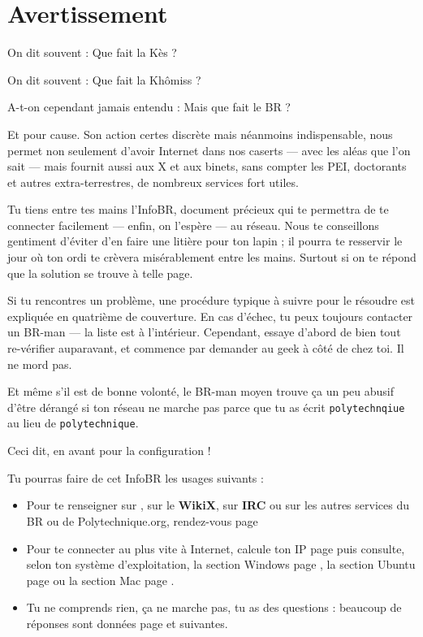 \thispagestyle{empty}

\section*{Avertissement}

On dit souvent : \og Que fait la Kès ? \fg

On dit souvent : \og Que fait la Khômiss ? \fg

A-t-on cependant jamais entendu : \og Mais que fait le BR ? \fg

Et pour cause. Son action certes discrète mais néanmoins indispensable, nous permet non seulement d'avoir Internet dans nos caserts --- avec les aléas que l'on sait --- mais fournit aussi aux X et aux binets,
sans compter les PEI, doctorants et autres extra-terrestres, de nombreux services fort utiles.

Tu tiens entre tes mains l'InfoBR, document pr\'ecieux qui te permettra de te connecter facilement
--- enfin, on l'esp\`ere --- au r\'eseau.
Nous te conseillons gentiment d'\'eviter d'en faire une liti\`ere pour ton lapin ; il pourra te resservir le jour o\`u ton ordi te cr\`evera mis\'erablement entre les
mains. Surtout si on te r\'epond que la solution se trouve \`a telle page.

Si tu rencontres un probl\`eme, une proc\'edure typique \`a suivre pour le r\'esoudre est expliqu\'ee en quatri\`eme de couverture.
En cas d'échec, tu peux toujours contacter un BR-man --- la liste est \`a l'int\'erieur.
Cependant, essaye d'abord de bien tout re-v\'erifier auparavant, et commence par demander au geek à côté de chez toi. Il ne mord pas.

Et m\^eme s'il est de bonne volont\'e, le BR-man moyen trouve ça un peu abusif d'\^etre d\'erang\'e si ton r\'eseau ne
marche pas parce que tu as \'ecrit \texttt{polytechnqiue} au lieu de \texttt{polytechnique}.

Ceci dit, en avant pour la configuration !

\vfill


Tu pourras faire de cet InfoBR les usages suivants :
\begin{itemize}
\item Pour te renseigner sur \fkz, sur le \textbf{WikiX}, sur \textbf{IRC} ou sur les autres services du BR ou de Polytechnique.org, rendez-vous page \pageref{services}
\item Pour te connecter au plus vite à Internet, calcule ton IP page \pageref{ip} puis consulte, selon ton système d'exploitation, la section Windows page \pageref{windows},
la section Ubuntu page \pageref{ubuntu} ou la section Mac page \pageref{mac}.
\item Tu ne comprends rien, ça ne marche pas, tu as des questions : beaucoup de réponses sont données page \pageref{faq} et suivantes.

\end{itemize}

